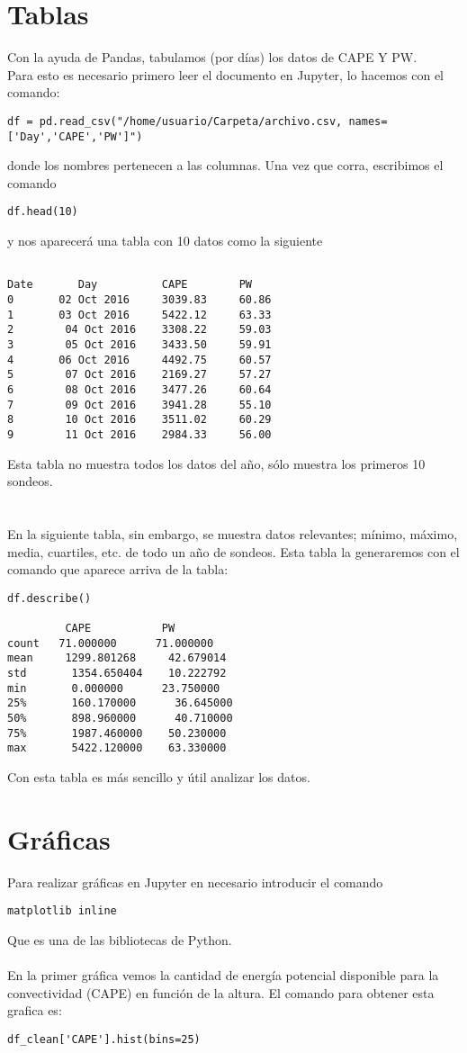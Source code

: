 \documentclass[a4paper]{article}
\begin{document}
\section*{Tablas}
Con la ayuda de Pandas, tabulamos (por días) los datos de CAPE Y PW. \\
Para esto es necesario primero leer el documento en Jupyter, lo hacemos con el comando: \begin{verbatim}
df = pd.read_csv("/home/usuario/Carpeta/archivo.csv, names=['Day','CAPE','PW']")
\end{verbatim} 
donde los nombres pertenecen a las columnas. Una vez que corra, escribimos el comando \begin{verbatim}
df.head(10)
\end{verbatim}
y nos aparecerá una tabla con 10 datos como la siguiente 
\begin{verbatim}

Date	   Day 	        CAPE    	PW
0      	02 Oct 2016 	3039.83 	60.86
1      	03 Oct 2016 	5422.12 	63.33
2 	     04 Oct 2016 	3308.22 	59.03
3 	     05 Oct 2016 	3433.50 	59.91
4  	    06 Oct 2016 	4492.75 	60.57
5 	     07 Oct 2016 	2169.27 	57.27
6 	     08 Oct 2016 	3477.26 	60.64
7 	     09 Oct 2016 	3941.28 	55.10
8 	     10 Oct 2016 	3511.02 	60.29
9 	     11 Oct 2016 	2984.33 	56.00
\end{verbatim}

Esta tabla no muestra todos los datos del año, sólo muestra los primeros 10 sondeos.\\ \\ \\
En la siguiente tabla, sin embargo, se muestra datos relevantes; mínimo, máximo, media, cuartiles, etc. de todo un año de sondeos. Esta tabla la generaremos con el comando que aparece arriva de la tabla:\\
\begin{verbatim}
df.describe()

 	     CAPE 	        PW
count 	71.000000 	   71.000000
mean 	 1299.801268 	 42.679014
std 	  1354.650404 	 10.222792
min 	  0.000000 	    23.750000
25% 	  160.170000 	  36.645000
50% 	  898.960000 	  40.710000
75% 	  1987.460000 	 50.230000
max 	  5422.120000 	 63.330000
\end{verbatim}
Con esta tabla es más sencillo y útil analizar los datos.

\newpage
\section*{Gráficas}
Para realizar gráficas en Jupyter en necesario introducir el comando \begin{verbatim}
matplotlib inline
\end{verbatim}
Que es una de las bibliotecas de Python.\\ \\
En la primer gráfica vemos la cantidad de energía potencial disponible para la convectividad (CAPE) en función de la altura. El comando para obtener esta grafica es: \begin{verbatim}
df_clean['CAPE'].hist(bins=25)
\end{verbatim} 
\end{document}
